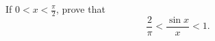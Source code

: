 \begin{exercise}
	If $0 < x < \frac{\pi}{2}$, prove that
	\begin{equation*}
	\frac{2}{\pi} < \frac{\sin x}{x} < 1.
	\end{equation*}
\end{exercise}
